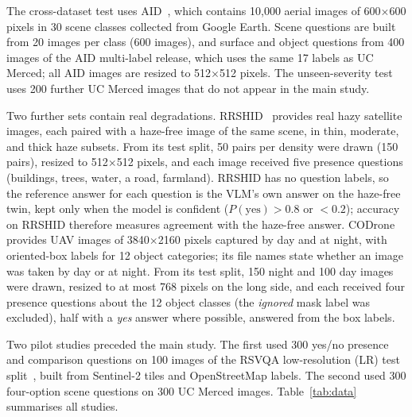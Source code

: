 \documentclass[lettersize,journal]{IEEEtran}
\begin{document}
The cross-dataset test uses AID~\cite{xia2017aid}, which contains 10,000 aerial images of 600$\times$600 pixels in 30 scene classes collected from Google Earth. Scene questions are built from 20 images per class (600 images), and surface and object questions from 400 images of the AID multi-label release, which uses the same 17 labels as UC Merced; all AID images are resized to 512$\times$512 pixels. The unseen-severity test uses 200 further UC Merced images that do not appear in the main study.

Two further sets contain real degradations. RRSHID~\cite{zhu2025rrshid} provides real hazy satellite images, each paired with a haze-free image of the same scene, in thin, moderate, and thick haze subsets. From its test split, 50 pairs per density were drawn (150 pairs), resized to 512$\times$512 pixels, and each image received five presence questions (buildings, trees, water, a road, farmland). RRSHID has no question labels, so the reference answer for each question is the VLM's own answer on the haze-free twin, kept only when the model is confident ($P(\text{yes}) > 0.8$ or $< 0.2$); accuracy on RRSHID therefore measures agreement with the haze-free answer. CODrone~\cite{ye2025codrone} provides UAV images of 3840$\times$2160 pixels captured by day and at night, with oriented-box labels for 12 object categories; its file names state whether an image was taken by day or at night. From its test split, 150 night and 100 day images were drawn, resized to at most 768 pixels on the long side, and each received four presence questions about the 12 object classes (the \emph{ignored} mask label was excluded), half with a \emph{yes} answer where possible, answered from the box labels.

Two pilot studies preceded the main study. The first used 300 yes/no presence and comparison questions on 100 images of the RSVQA low-resolution (LR) test split~\cite{lobry2020rsvqa}, built from Sentinel-2 tiles and OpenStreetMap labels. The second used 300 four-option scene questions on 300 UC Merced images. Table~\ref{tab:data} summarises all studies.
\end{document}
